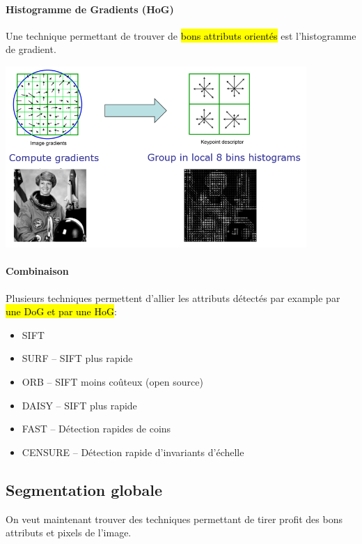 \documentclass[letterpaper, 12pt]{article}
\newcommand{\alinea}{
\hspace*{0.5cm}}
\begin{document}
			\paragraph{Histogramme de Gradients (HoG)}
				\alinea Une technique permettant de trouver de \hl{bons attributs orientés} est l'histogramme de gradient.
				\begin{center}
					\includegraphics[width=4.5in]{Images/hog}
				\end{center}
			\paragraph{Combinaison}
				\alinea Plusieurs techniques permettent d'allier les attributs détectés par example par 
					\hl{une DoG et par une HoG}:
				\begin{itemize}
					\setlength\itemsep{0cm}
					\item SIFT
					\item SURF -- SIFT plus rapide
					\item ORB -- SIFT moins coûteux (open source)
					\item DAISY -- SIFT plus rapide
					\item FAST -- Détection rapides de coins
					\item CENSURE -- Détection rapide d'invariants d'échelle
				\end{itemize}
	\subsection{Segmentation globale}
		\alinea On veut maintenant trouver des techniques permettant de tirer profit des bons attributs et pixels de l'image.
\end{document}
